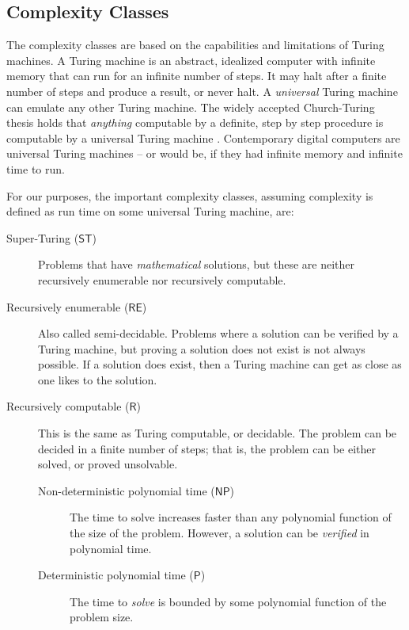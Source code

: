 \documentclass[11pt,papersize=a4]{scrartcl}
\begin{document}
 \subsection*{Complexity Classes} \label{sec:complexity}
 
 The complexity classes are based on the capabilities and limitations of Turing machines. A Turing machine is an abstract, idealized computer with infinite memory that can run for an infinite number of steps. It may halt after a finite number of steps and produce a result, or never halt. A \emph{universal} Turing machine can emulate any other Turing machine. The widely accepted Church-Turing thesis holds that \emph{anything} computable by a definite, step by step procedure is computable by a universal Turing machine \parencite{sep-church-turing}. Contemporary digital computers are universal Turing machines -- or would be, if they had infinite memory and infinite time to run.
 
 For our purposes, the important complexity classes, assuming complexity is defined as run time on some universal Turing machine, are:

\begin{description}
\item[Super-Turing ($\mathsf{ST}$)] Problems that have \emph{mathematical} solutions, but these are neither recursively enumerable nor recursively computable.
\item[Recursively enumerable ($\mathsf{RE}$)] Also called semi-decidable. Problems where a solution can be verified by a Turing machine, but proving a solution does not exist is not always possible. If a solution does exist, then a Turing machine can get as close as one likes to the solution.
\item[Recursively computable ($\mathsf{R}$)] This is the same as Turing computable, or decidable. The problem can be decided in a finite number of steps; that is, the problem can be either solved, or proved unsolvable.
\begin{description}
\item[Non-deterministic polynomial time ($\mathsf{NP}$)] The time to solve increases faster than any polynomial function of the size of the problem. However, a solution can be \emph{verified} in polynomial time.
\item[Deterministic polynomial  time ($\mathsf{P}$)] The time to \emph{solve} is bounded by some polynomial function of the problem size.
\end{description}
\end{description}
\end{document}
